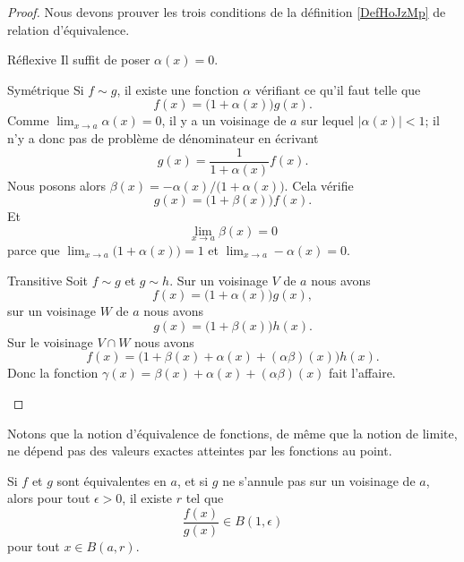 \begin{proof}
	Nous devons prouver les trois conditions de la définition \ref{DefHoJzMp} de relation d'équivalence.
	\begin{subproof}
		\item[Réflexive]
		Il suffit de poser \( \alpha(x)=0\).
		\item[Symétrique]
		Si \( f\sim g\), il existe une fonction \( \alpha\) vérifiant ce qu'il faut telle que
		\begin{equation}
			f(x)=\big( 1+\alpha(x) \big)g(x).
		\end{equation}
		Comme \( \lim_{x\to a} \alpha(x)=0\), il y a un voisinage de \( a\) sur lequel \( | \alpha(x) |<1\); il n'y a donc pas de problème de dénominateur en écrivant
		\begin{equation}
			g(x)=\frac{1}{ 1+\alpha(x) }f(x).
		\end{equation}
		Nous posons alors \( \beta(x)=-\alpha(x)/\big( 1+\alpha(x) \big)\). Cela vérifie
		\begin{equation}
			g(x)=\big( 1+\beta(x) \big)f(x).
		\end{equation}
		Et
		\begin{equation}
			\lim_{x\to a} \beta(x)=0
		\end{equation}
		parce que \( \lim_{x\to a} \big( 1 + \alpha(x)\big)=1\) et \( \lim_{x\to a} -\alpha(x)=0\).
		\item[Transitive]
		Soit \( f\sim g\) et \( g\sim h\). Sur un voisinage \( V\) de \( a\) nous avons
		\begin{equation}
			f(x)=\big( 1+\alpha(x) \big)g(x),
		\end{equation}
		sur un voisinage \( W\) de \( a\) nous avons
		\begin{equation}
			g(x)=\big( 1+\beta(x) \big)h(x).
		\end{equation}
		Sur le voisinage \( V\cap W\) nous avons
		\begin{equation}
			f(x)=\big( 1+\beta(x)+\alpha(x)+(\alpha\beta)(x) \big)h(x).
		\end{equation}
		Donc la fonction \( \gamma(x)=\beta(x)+\alpha(x)+(\alpha\beta)(x)\) fait l'affaire.
	\end{subproof}
\end{proof}

Notons que la notion d'équivalence de fonctions, de même que la notion de limite, ne dépend pas des valeurs exactes atteintes par les fonctions au point.

\begin{lemma}
	Si \( f\) et \( g\) sont équivalentes en \( a\), et si \( g\) ne s'annule pas sur un voisinage de \( a\), alors pour tout \( \epsilon>0\), il existe \( r\) tel que
	\begin{equation}
		\frac{ f(x) }{ g(x) }\in B(1,\epsilon)
	\end{equation}
	pour tout \( x\in B(a,r)\).
\end{lemma}

